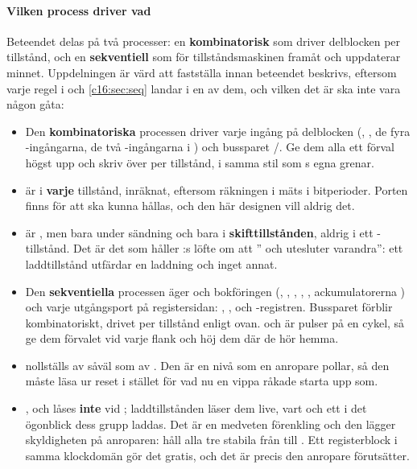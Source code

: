 \paragraph{Vilken process driver vad}
Beteendet delas på två processer: en \textbf{kombinatorisk} som driver delblocken per tillstånd, och
en \textbf{sekventiell} som för tillståndsmaskinen framåt och uppdaterar minnet. Uppdelningen är värd
att fastställa innan beteendet beskrivs, eftersom varje regel i  och
\ref{c16:sec:seq} landar i en av dem, och vilken det är ska inte vara någon gåta:
\begin{itemize}
  \item Den \textbf{kombinatoriska} processen driver varje ingång på delblocken (,
    , de fyra -ingångarna, de två -ingångarna i
    ) och bussparet /. Ge dem alla ett förval högst upp och
    skriv över per tillstånd, i samma stil som s egna grenar.
  \item {} är  i \textbf{varje} tillstånd,  inräknat,
    eftersom räkningen i  mäts i bitperioder. Porten finns för att 
    ska kunna hållas, och den här designen vill aldrig det.
  \item {} är , men bara under sändning och bara i
    \textbf{skifttillstånden}, aldrig i ett -tillstånd. Det är det som håller
    :s löfte om att ” och  utesluter varandra”: ett
    laddtillstånd utfärdar en laddning och inget annat.
  \item Den \textbf{sekventiella} processen äger  och bokföringen (,
    , , , , ackumulatorerna
    ) och varje utgångsport på registersidan: , ,
     och -registren. Bussparet förblir kombinatoriskt, drivet per tillstånd
    enligt ovan.  och  är pulser på en cykel, så ge dem förvalet
     vid varje flank och höj dem där de hör hemma.
  \item {} nollställs av  såväl som av . Den är en nivå
    som en anropare pollar, så den måste läsa  ur reset i stället för vad nu en vippa
    råkade starta upp som.
  \item {},  och  låses \textbf{inte} vid ;
    laddtillstånden läser dem live, vart och ett i det ögonblick dess grupp laddas. Det är en medveten
    förenkling och den lägger skyldigheten på anroparen: håll alla tre stabila från 
    till . Ett registerblock i samma klockdomän gör det gratis, och det är precis den
    anropare  förutsätter.
\end{itemize}


